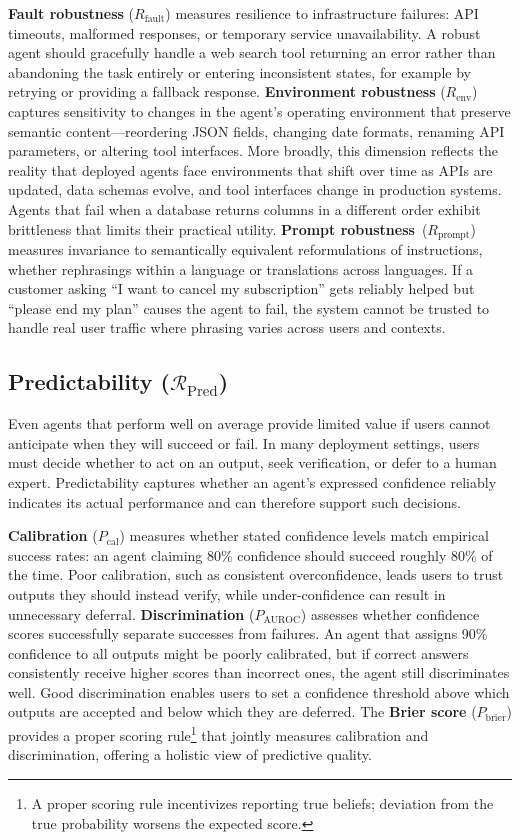\documentclass[11pt]{article}
\newcounter{dimension}
\begin{document}
\textbf{Fault robustness} ($R_{\text{fault}}$) measures resilience to infrastructure failures: API timeouts, malformed responses, or temporary service unavailability. A robust agent should gracefully handle a web search tool returning an error rather than abandoning the task entirely or entering inconsistent states, for example by retrying or providing a fallback response. \textbf{Environment robustness} ($R_{\text{env}}$) captures sensitivity to changes in the agent's operating environment that preserve semantic content---reordering JSON fields, changing date formats, renaming API parameters, or altering tool interfaces. More broadly, this dimension reflects the reality that deployed agents face environments that shift over time as APIs are updated, data schemas evolve, and tool interfaces change in production systems. Agents that fail when a database returns columns in a different order exhibit brittleness that limits their practical utility. \textbf{Prompt robustness}~($R_{\text{prompt}}$) measures invariance to semantically equivalent reformulations of instructions, whether rephrasings within a language or translations across languages. If a customer asking ``I want to cancel my subscription'' gets reliably helped but ``please end my plan'' causes the agent to fail, the system cannot be trusted to handle real user traffic where phrasing varies across users and contexts.

\subsection{Predictability ($\mathcal{R}_{\text{Pred}}$)}

Even agents that perform well on average provide limited value if users cannot anticipate when they will succeed or fail. In many deployment settings, users must decide whether to act on an output, seek verification, or defer to a human expert. Predictability captures whether an agent's expressed confidence reliably indicates its actual performance and can therefore support such decisions.

\textbf{Calibration} ($P_{\text{cal}}$) measures whether stated confidence levels match empirical success rates: an agent claiming 80\% confidence should succeed roughly 80\% of the time. Poor calibration, such as consistent overconfidence, leads users to trust outputs they should instead verify, while under-confidence can result in unnecessary deferral. \textbf{Discrimination} ($P_{\text{AUROC}}$) assesses whether confidence scores successfully separate successes from failures. An agent that assigns 90\% confidence to all outputs might be poorly calibrated, but if correct answers consistently receive higher scores than incorrect ones, the agent still discriminates well. Good discrimination enables users to set a confidence threshold above which outputs are accepted and below which they are deferred. The \textbf{Brier score} ($P_{\text{brier}}$) provides a proper scoring rule\footnote{A proper scoring rule incentivizes reporting true beliefs; deviation from the true probability worsens the expected score.} that jointly measures calibration and discrimination, offering a holistic view of predictive quality.
\end{document}
